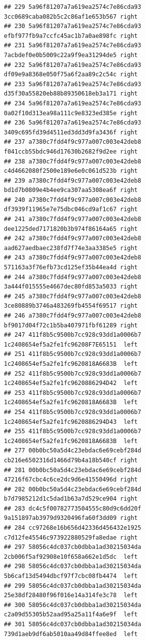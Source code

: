 \documentclass[]{article}
\begin{document}
\begin{verbatim}
## 229 5a96f81207a7a619ea2574c7e86cda93 3cc0689caba082b5c2c86af1e653b567 right
## 230 5a96f81207a7a619ea2574c7e86cda93 efbf977fb9a7ccfc45ac1b7a0ae898fc right
## 231 5a96f81207a7a619ea2574c7e86cda93 7acbdef0e0b5009c22a9f9ea31294de5 right
## 232 5a96f81207a7a619ea2574c7e86cda93 df09e9a8368e050f75a6f2aa89c2c54c right
## 233 5a96f81207a7a619ea2574c7e86cda93 d35f30a55820eb88b89350618eb3a171 right
## 234 5a96f81207a7a619ea2574c7e86cda93 0a02f10d313ea98a111c9e8323ed385e right
## 236 5a96f81207a7a619ea2574c7e86cda93 3409c695fd39d4511ed3dd3d9fa3436f right
## 237 a7380c7fdd4f9c977a007c003e42deb8 f041ccb55bdc946d17630b2682f9d2ee right
## 238 a7380c7fdd4f9c977a007c003e42deb8 c4d4662080f2500e189e6e0c061d523b right
## 239 a7380c7fdd4f9c977a007c003e42deb8 bd1d7b0809e4b4ee9ca307aa5308ea6f right
## 240 a7380c7fdd4f9c977a007c003e42deb8 df3939f11965e7e75dbc046cd9af1c67 right
## 241 a7380c7fdd4f9c977a007c003e42deb8 dee1225ded7171820b3b974f86164a65 right
## 242 a7380c7fdd4f9c977a007c003e42deb8 aad627aedbaec238fd7f74e3aa3385e5 right
## 243 a7380c7fdd4f9c977a007c003e42deb8 571163a3f76efb73cd125ef35b44ea4d right
## 244 a7380c7fdd4f9c977a007c003e42deb8 3a444f015555e4667dec80fd853a5033 right
## 245 a7380c7fdd4f9c977a007c003e42deb8 3ce80889b3746a483269fb4554f69517 right
## 246 a7380c7fdd4f9c977a007c003e42deb8 bf9017d04f72c1b5ba407971fbf61289 right
## 247 411f8b5c9500b7cc928c93dd1a0006b7 1c2408654ef5a2fe1fc96208F7E65151  left
## 251 411f8b5c9500b7cc928c93dd1a0006b7 1c2408654ef5a2fe1fc9620818A6683B  left
## 252 411f8b5c9500b7cc928c93dd1a0006b7 1c2408654ef5a2fe1fc9620886294D42  left
## 253 411f8b5c9500b7cc928c93dd1a0006b7 1c2408654ef5a2fe1fc9620818A6683B  left
## 254 411f8b5c9500b7cc928c93dd1a0006b7 1c2408654ef5a2fe1fc9620886294D43  left
## 255 411f8b5c9500b7cc928c93dd1a0006b7 1c2408654ef5a2fe1fc9620818A6683B  left
## 277 00b0bc50a5d4c23ebdac6e69cebf284d cb216e6502316d1466d79b4a18b540cf right
## 281 00b0bc50a5d4c23ebdac6e69cebf284d 47216f67cbc4c6ce2dc9d6e41550496d right
## 282 00b0bc50a5d4c23ebdac6e69cebf284d b7d7985212d1c5dad1b63a7d529ce904 right
## 283 dc4c5f00782773504555c80d9c6dd20f 9a151897ab3979d9320496fa60f3dd09 right
## 284 cc97268e16b656d42336d456432e1925 c7d12fe45546c973922880529fa8edae right
## 297 58056c4dc037cb0dbba1ad30215034da 2cb006f5af92908e10f658a662e1d5dc  left
## 298 58056c4dc037cb0dbba1ad30215034da 5b6caf13d5494dbcf97f7cbc08fb4474  left
## 299 58056c4dc037cb0dbba1ad30215034da 25e38df28480f96f016e14a314fe3c78  left
## 300 58056c4dc037cb0dbba1ad30215034da c2a09d55305b52aad95a25a11f4a6e9f  left
## 301 58056c4dc037cb0dbba1ad30215034da 739d1aeb9df6ab5010aa49d84ffee8ed  left

\end{verbatim}
\end{document}
